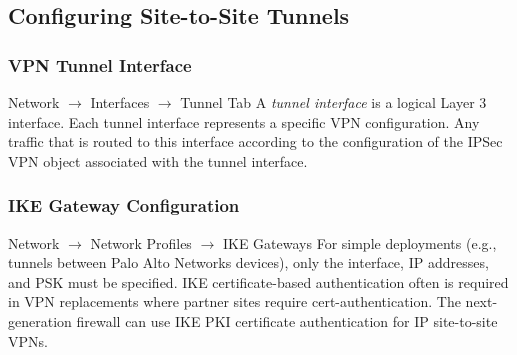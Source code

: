 \subsection{Configuring Site-to-Site Tunnels}
\subsubsection{VPN Tunnel Interface}
Network $\rightarrow$ Interfaces $\rightarrow$ Tunnel Tab
\newline
A \textit{tunnel interface} is a logical Layer 3 interface.
Each tunnel interface represents a specific VPN configuration.
Any traffic that is routed to this interface according to the configuration of the IPSec VPN object associated with the tunnel interface.

\subsubsection{IKE Gateway Configuration}
Network $\rightarrow$ Network Profiles $\rightarrow$ IKE Gateways 
\newline
For simple deployments (e.g., tunnels between Palo Alto Networks devices), only the interface, IP addresses, and PSK must be specified.
IKE certificate-based authentication often is required in VPN replacements where partner sites require cert-authentication.
The next-generation firewall can use IKE PKI certificate authentication for IP site-to-site VPNs.
\newline

